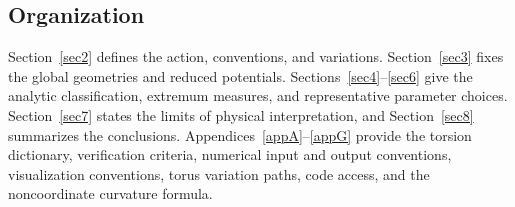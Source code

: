 \subsection{Organization}
Section~\ref{sec2} defines the action, conventions, and variations.
Section~\ref{sec3} fixes the global geometries and reduced potentials.
Sections~\ref{sec4}--\ref{sec6} give the analytic classification,
extremum measures, and representative parameter choices.
Section~\ref{sec7} states the limits of physical interpretation, and
Section~\ref{sec8} summarizes the conclusions.
Appendices~\ref{appA}--\ref{appG} provide the torsion dictionary,
verification criteria, numerical input and output conventions,
visualization conventions, torus variation paths, code access,
and the noncoordinate curvature formula.
